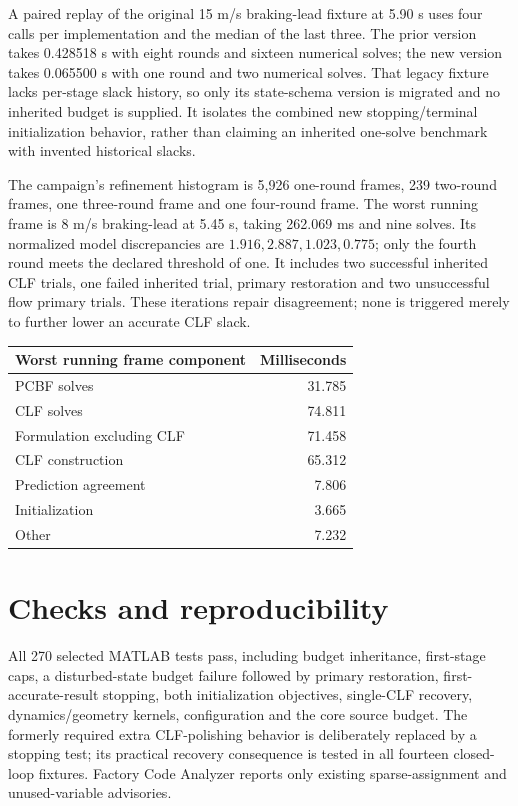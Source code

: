 \documentclass[11pt]{article}
\begin{document}
A paired replay of the original 15 m/s braking-lead fixture at 5.90 s uses
four calls per implementation and the median of the last three. The prior
version takes 0.428518 s with eight rounds and sixteen numerical solves;
the new version takes 0.065500 s with one round and two numerical solves.
That legacy fixture lacks per-stage slack history, so only its state-schema
version is migrated and no inherited budget is supplied. It isolates the
combined new stopping/terminal initialization behavior, rather than claiming
an inherited one-solve benchmark with invented historical slacks.

The campaign's refinement histogram is 5,926 one-round frames, 239 two-round
frames, one three-round frame and one four-round frame. The worst running
frame is 8 m/s braking-lead at 5.45 s, taking 262.069 ms and nine solves.
Its normalized model discrepancies are $1.916,2.887,1.023,0.775$; only the
fourth round meets the declared threshold of one. It includes two successful
inherited CLF trials, one failed inherited trial, primary restoration and two
unsuccessful flow primary trials. These iterations repair disagreement;
none is triggered merely to further lower an accurate CLF slack.

\begin{center}\begin{tabular}{lr}\toprule
Worst running frame component & Milliseconds\\\midrule
PCBF solves & 31.785\\
CLF solves & 74.811\\
Formulation excluding CLF & 71.458\\
CLF construction & 65.312\\
Prediction agreement & 7.806\\
Initialization & 3.665\\
Other & 7.232\\\bottomrule\end{tabular}\end{center}

\section{Checks and reproducibility}
All 270 selected MATLAB tests pass, including budget inheritance, first-stage
caps, a disturbed-state budget failure followed by primary restoration,
first-accurate-result stopping, both initialization objectives, single-CLF
recovery, dynamics/geometry kernels, configuration and the core source budget.
The formerly required extra CLF-polishing behavior is deliberately replaced
by a stopping test; its practical recovery consequence is tested in all
fourteen closed-loop fixtures. Factory Code Analyzer reports only existing
sparse-assignment and unused-variable advisories.
\end{document}
